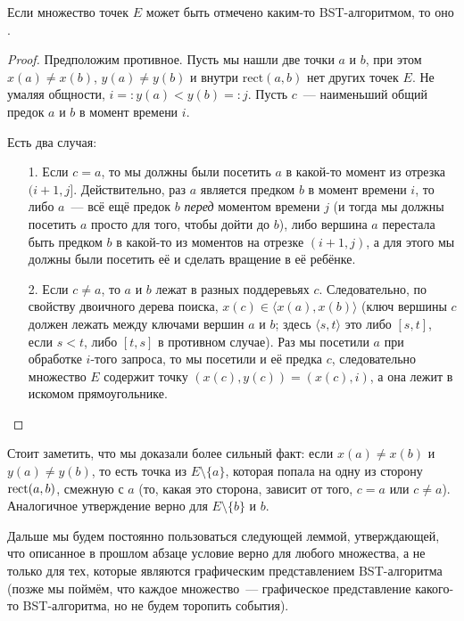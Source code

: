 \begin{theorem} Если множество точек $E$ может быть отмечено каким-то BST-алгоритмом,
то оно \arbs.
\end{theorem}
\begin{proof} Предположим противное. Пусть мы нашли две точки $a$ и $b$, при этом
$x(a) \neq x(b)$, $y(a) \neq y(b)$ и внутри $\mathrm{rect}(a, b)$ нет других точек $E$. 
Не умаляя общности, $i =: y(a) < y(b) =: j$. Пусть $c$~--- наименьший общий предок $a$ и $b$ в момент времени $i$.

Есть два случая:
\begin{itemize}
\item[1.] Если $c = a$, то мы должны были посетить $a$ в какой-то момент из отрезка $(i + 1, j]$. Действительно, раз $a$ является предком $b$ в момент времени $i$, то либо $a$~--- всё ещё предок $b$ \emph{перед} моментом времени $j$ (и тогда мы должны посетить $a$ просто для того, чтобы дойти до $b$), либо вершина $a$ перестала быть предком $b$ в какой-то из моментов на отрезке $(i + 1, j)$, а для этого мы должны были посетить её и сделать вращение в её ребёнке.

\item[2.] Если $c \neq a$, то $a$ и $b$ лежат в разных поддеревьях $c$. Следовательно, по свойству двоичного дерева поиска, $x(c) \in \langle x(a), x(b) \rangle$ (ключ вершины $c$ должен лежать между ключами вершин $a$ и $b$; здесь $\langle s, t \rangle$ это либо $[s, t]$, если $s < t$, либо $[t, s]$ в противном случае). Раз мы посетили $a$ при обработке $i$-того
запроса, то мы посетили и её предка $c$, следовательно множество $E$ содержит точку $(x(c), y(c)) = (x(c), i)$, а она лежит в искомом прямоугольнике.
\end{itemize}
\end{proof}

Стоит заметить, что мы доказали более сильный факт: если $x(a) \neq x(b)$ и $y(a) \neq y(b)$, то есть точка из $E \setminus \{a \}$, которая попала на одну из сторону $\operatorname{rect}(a, b)$, смежную с $a$ (то, какая это сторона, зависит от того, $c = a$ или $c \neq a$). Аналогичное утверждение верно для $E \setminus \{ b \}$ и $b$. 

Дальше мы будем постоянно пользоваться следующей леммой, утверждающей, что описанное в прошлом абзаце условие верно для любого \arbs множества, а не только для тех, которые
являются графическим представлением BST-алгоритма (позже мы поймём, что каждое
\arbs множество~--- графическое представление какого-то BST-алгоритма, но не будем торопить события).

